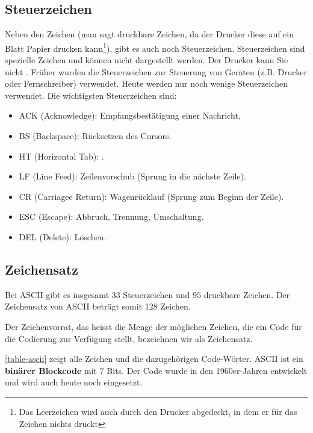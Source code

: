 \subsection{Steuerzeichen}

Neben den  Zeichen (man sagt druckbare Zeichen, da der Drucker diese auf ein Blatt Papier drucken kann\footnote{Das Leerzeichen wird auch durch den Drucker abgedeckt, in dem er für das Zeichen nichts druckt}), gibt es auch noch Steuerzeichen. Steuerzeichen sind spezielle Zeichen und können nicht dargestellt werden. Der Drucker kann Sie nicht . Früher wurden die Steuerzeichen zur Steuerung von Geräten (z.B. Drucker oder Fernschreiber) verwendet. Heute werden nur noch wenige Steuerzeichen verwendet. Die wichtigsten Steuerzeichen sind:

\begin{itemize}
\item ACK (Acknowledge): Empfangsbestätigung einer Nachricht.
\item BS (Backspace): Rücksetzen des Cursors.
\item HT (Horizontal Tab): .
\item LF (Line Feed): Zeilenvorschub (Sprung in die nächste Zeile).
\item CR (Carriagee Return):  Wagenrücklauf (Sprung zum Beginn der Zeile).
\item ESC (Escape): Abbruch, Trennung, Umschaltung.
\item DEL (Delete): Löschen.
\end{itemize}

\subsection{Zeichensatz}

Bei \ac{ASCII} gibt es insgesamt $33$ Steuerzeichen und $95$ druckbare Zeichen. Der Zeichensatz von \ac{ASCII} beträgt somit 128 Zeichen.

\begin{definition}[Zeichensatz]
Der Zeichenvorrat, das heisst die Menge der möglichen Zeichen, die ein Code für die Codierung zur Verfügung stellt, bezeichnen wir als Zeichensatz.
\end{definition}

\autoref{table-ascii} zeigt alle Zeichen und die dazugehörigen Code-Wörter. \ac{ASCII} ist ein \textbf{binärer Blockcode} mit $7$ Bits. Der Code wurde in den 1960er-Jahren entwickelt und wird auch heute noch eingesetzt.

